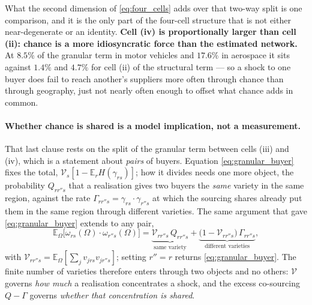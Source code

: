 What the second dimension of \eqref{eq:four_cells} adds over that two-way split is one comparison, and it is the only part of the four-cell structure that is not either near-degenerate or an identity. \textbf{Cell (iv) is proportionally larger than cell (ii): chance is a more idiosyncratic force than the estimated network.} At $8.5\%$ of the granular term in motor vehicles and $17.6\%$ in aerospace it sits against $1.4\%$ and $4.7\%$ for cell (ii) of the structural term --- so a shock to one buyer does fail to reach another's suppliers more often through chance than through geography, just not nearly often enough to offset what chance adds in common.

\paragraph{Whether chance is shared is a model implication, not a measurement.}
That last clause rests on the split of the granular term between cells (iii) and (iv), which is a statement about \emph{pairs} of buyers. Equation \eqref{eq:granular_buyer} fixes the total, $\mathcal{V}_{s}[1-\mathbb{E}_{r}H(\gamma_{rs})]$; how it divides needs one more object, the probability $Q_{rr''s}$ that a realisation gives two buyers the \emph{same} variety in the same region, against the rate $\Gamma_{rr''s}=\gamma_{rs}\!\cdot\!\gamma_{r''s}$ at which the sourcing shares already put them in the same region through different varieties. The same argument that gave \eqref{eq:granular_buyer} extends to any pair,
\begin{equation}
\mathbb{E}_{\Omega}\big[\omega_{rs}(\Omega)\!\cdot\!\omega_{r''s}(\Omega)\big]
=\underbrace{\mathcal{V}_{rr''s}\,Q_{rr''s}}_{\text{same variety}}
+\underbrace{\big(1-\mathcal{V}_{rr''s}\big)\,\Gamma_{rr''s}}_{\text{different varieties}},
\label{eq:variety_kernel}
\end{equation}
with $\mathcal{V}_{rr''s}=\mathbb{E}_{\Omega}[\sum_{j}v_{jrs}v_{jr''s}]$; setting $r''=r$ returns \eqref{eq:granular_buyer}. The finite number of varieties therefore enters through two objects and no others: $\mathcal{V}$ governs \emph{how much} a realisation concentrates a shock, and the excess co-sourcing $Q-\Gamma$ governs \emph{whether that concentration is shared}.

